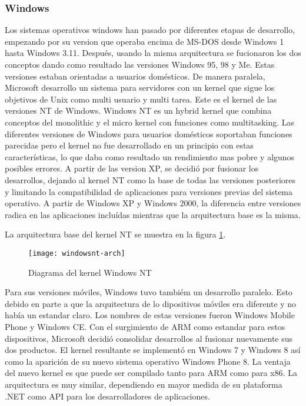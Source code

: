 \subsubsection{Windows} Los sistemas operativos windows han pasado por
diferentes etapas de desarrollo, empezando por su version que operaba encima de
MS-DOS desde Windows 1 hasta Windows 3.11. Después, usando la misma
arquitectura se fucionaron los dos conceptos dando como resultado las versiones
Windows 95, 98 y Me. Estas versiones estaban orientadas a usuarios
domésticos. De manera paralela, Microsoft desarrollo un sistema para servidores
con un kernel que sigue los objetivos de Unix como multi usuario y multi
tarea. Este es el kernel de las versiones NT de Windows. Windows NT es un
hybrid kernel que combina conceptos del monolithic y el micro kernel con
funciones como multitasking. Las diferentes versiones de Windows para usuarios
domésticos soportaban funciones parecidas pero el kernel no fue desarrollado en
un principio con estas características, lo que daba como resultado un
rendimiento mas pobre y algunos posibles errores. A partir de las version XP,
se decidió por fusionar los desarrollos, dejando al kernel NT como la base de
todas las versiones posteriores y limitando la compatibilidad de aplicaciones
para versiones previas del sistema operativo. A partir de Windows XP y Windows
2000, la diferencia entre versiones radica en las aplicaciones incluídas
mientras que la arquitectura base es la misma.

La arquitectura base del kernel NT se muestra en la figura \ref{fig:nt-kernel}.

\begin{figure}[H]
  \centering
  \texttt{[image: windowsnt-arch]}
  \caption{Diagrama del kernel Windows NT}
  \label{fig:nt-kernel}
\end{figure}


Para sus versiones móviles, Windows tuvo tambiém un desarrollo paralelo. Esto
debido en parte a que la arquitectura de lo dipositivos móviles era diferente y
no había un estandar claro. Los nombres de estas versiones fueron Windows
Mobile Phone y Windows CE. Con el surgimiento de ARM como estandar para estos
dispositivos, Microsoft decidió consolidar desarrollos al fusionar nuevamente
sus dos productos. El kernel resultante se implementó en Windows 7 y Windows 8
así como la aparición de su nuevo sistema operativo Windows Phone 8. La ventaja
del nuevo kernel es que puede ser compilado tanto para ARM como para x86. La
arquitectura es muy similar, dependiendo en mayor medida de su plataforma .NET
como API para los desarrolladores de aplicaciones.

